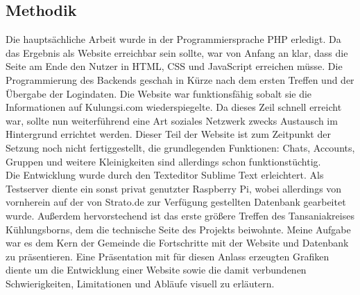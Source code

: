 \subsection{Methodik} %
Die hauptsächliche Arbeit wurde in der Programmiersprache PHP erledigt.
Da das Ergebnis als Website erreichbar sein sollte,
war von Anfang an klar, dass die Seite am Ende den Nutzer in HTML, CSS und JavaScript
erreichen müsse.
Die Programmierung des Backends geschah in Kürze nach dem ersten Treffen und der Übergabe der Logindaten.
Die Website war funktionsfähig sobalt sie die Informationen auf Kulungsi.com wiederspiegelte.
Da dieses Zeil schnell erreicht war, sollte nun weiterführend eine Art soziales Netzwerk zwecks Austausch im Hintergrund errichtet werden.
Dieser Teil der Website ist zum Zeitpunkt der Setzung noch nicht fertiggestellt, die grundlegenden
Funktionen: Chats, Accounts, Gruppen und weitere Kleinigkeiten sind allerdings schon funktionstüchtig.\\
Die Entwicklung wurde durch den Texteditor Sublime Text erleichtert.
Als Testserver diente ein sonst privat genutzter Raspberry Pi,
wobei allerdings von vornherein auf der von Strato.de zur Verfügung gestellten Datenbank gearbeitet wurde.
Außerdem hervorstechend ist das erste größere Treffen des Tansaniakreises Kühlungsborns,
dem die technische Seite des Projekts beiwohnte.
Meine Aufgabe war es dem Kern der Gemeinde die Fortschritte mit der Website und Datenbank zu präsentieren.
Eine Präsentation mit für diesen Anlass erzeugten Grafiken diente um die Entwicklung einer Website
sowie die damit verbundenen Schwierigkeiten, Limitationen und Abläufe visuell zu erläutern.


